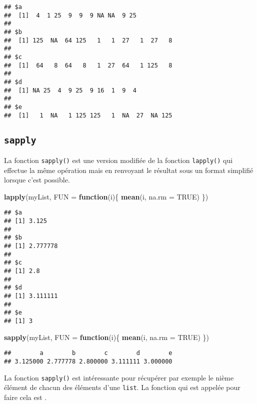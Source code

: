 \documentclass[]{book}
\newenvironment{Shaded}{\begin{snugshade}}{\end{snugshade}}
\newcommand{\KeywordTok}[1]{\textcolor[rgb]{0.13,0.29,0.53}{\textbf{#1}}}
\newcommand{\DataTypeTok}[1]{\textcolor[rgb]{0.13,0.29,0.53}{#1}}
\newcommand{\OtherTok}[1]{\textcolor[rgb]{0.56,0.35,0.01}{#1}}
\newcommand{\ControlFlowTok}[1]{\textcolor[rgb]{0.13,0.29,0.53}{\textbf{#1}}}
\newcommand{\NormalTok}[1]{#1}
\theoremstyle{definition}
\theoremstyle{definition}
\theoremstyle{definition}
\theoremstyle{remark}
\begin{document}
\begin{verbatim}
## $a
##  [1]  4  1 25  9  9  9 NA NA  9 25
## 
## $b
##  [1] 125  NA  64 125   1   1  27   1  27   8
## 
## $c
##  [1]  64   8  64   8   1  27  64   1 125   8
## 
## $d
##  [1] NA 25  4  9 25  9 16  1  9  4
## 
## $e
##  [1]   1  NA   1 125 125   1  NA  27  NA 125
\end{verbatim}

\subsection{\texorpdfstring{\texttt{sapply}}{sapply}}\label{l17lapply}

La fonction \texttt{sapply()} est une version modifiée de la fonction
\texttt{lapply()} qui effectue la même opération mais en renvoyant le
résultat sous un format simplifié lorsque c'est possible.

\begin{Shaded}
\begin{Highlighting}[]
\KeywordTok{lapply}\NormalTok{(myList, }\DataTypeTok{FUN =} \ControlFlowTok{function}\NormalTok{(i)\{}
  \KeywordTok{mean}\NormalTok{(i, }\DataTypeTok{na.rm =} \OtherTok{TRUE}\NormalTok{)}
\NormalTok{\})}
\end{Highlighting}
\end{Shaded}

\begin{verbatim}
## $a
## [1] 3.125
## 
## $b
## [1] 2.777778
## 
## $c
## [1] 2.8
## 
## $d
## [1] 3.111111
## 
## $e
## [1] 3
\end{verbatim}

\begin{Shaded}
\begin{Highlighting}[]
\KeywordTok{sapply}\NormalTok{(myList, }\DataTypeTok{FUN =} \ControlFlowTok{function}\NormalTok{(i)\{}
  \KeywordTok{mean}\NormalTok{(i, }\DataTypeTok{na.rm =} \OtherTok{TRUE}\NormalTok{)}
\NormalTok{\})}
\end{Highlighting}
\end{Shaded}

\begin{verbatim}
##        a        b        c        d        e 
## 3.125000 2.777778 2.800000 3.111111 3.000000
\end{verbatim}

La fonction \texttt{sapply()} est intéressante pour récupérer par
exemple le nième élément de chacun des éléments d'une \texttt{list}. La
fonction qui est appelée pour faire cela est
\texttt{\textquotesingle{}{[}{[}\textquotesingle{}}.
\end{document}
